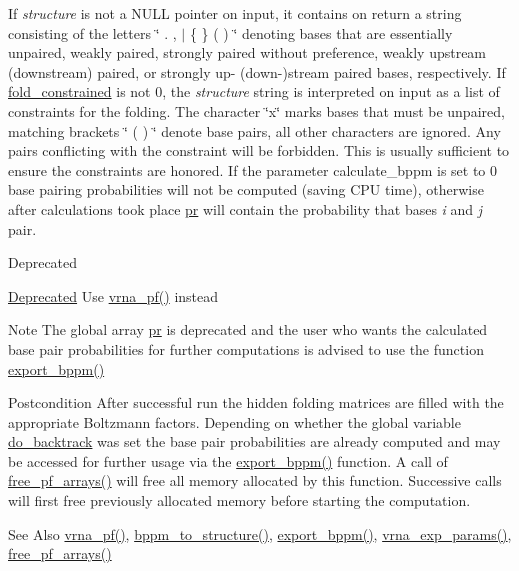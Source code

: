 If {\itshape structure} is not a N\-U\-L\-L pointer on input, it contains on return a string consisting of the letters \char`\"{} . , $\vert$ \{ \} ( ) \char`\"{} denoting bases that are essentially unpaired, weakly paired, strongly paired without preference, weakly upstream (downstream) paired, or strongly up-\/ (down-\/)stream paired bases, respectively. If \hyperlink{fold__vars_8h_a0afc287c2464866d94858c39175154af}{fold\-\_\-constrained} is not 0, the {\itshape structure} string is interpreted on input as a list of constraints for the folding. The character \char`\"{}x\char`\"{} marks bases that must be unpaired, matching brackets \char`\"{} ( ) \char`\"{} denote base pairs, all other characters are ignored. Any pairs conflicting with the constraint will be forbidden. This is usually sufficient to ensure the constraints are honored. If the parameter calculate\-\_\-bppm is set to 0 base pairing probabilities will not be computed (saving C\-P\-U time), otherwise after calculations took place \hyperlink{fold__vars_8h_ac98ec419070aee6831b44e5c700f090f}{pr} will contain the probability that bases {\itshape i} and {\itshape j} pair.

\begin{DoxyRefDesc}{Deprecated}
\item[\hyperlink{deprecated__deprecated000094}{Deprecated}]Use \hyperlink{group__pf__fold_ga29e256d688ad221b78d37f427e0e99bc}{vrna\-\_\-pf()} instead\end{DoxyRefDesc}


\begin{DoxyNote}{Note}
The global array \hyperlink{fold__vars_8h_ac98ec419070aee6831b44e5c700f090f}{pr} is deprecated and the user who wants the calculated base pair probabilities for further computations is advised to use the function \hyperlink{group__pf__fold_gac5ac7ee281aae1c5cc5898a841178073}{export\-\_\-bppm()} 
\end{DoxyNote}
\begin{DoxyPostcond}{Postcondition}
After successful run the hidden folding matrices are filled with the appropriate Boltzmann factors. Depending on whether the global variable \hyperlink{group__model__details_gad512b5dd4dbec60faccfe137bb474489}{do\-\_\-backtrack} was set the base pair probabilities are already computed and may be accessed for further usage via the \hyperlink{group__pf__fold_gac5ac7ee281aae1c5cc5898a841178073}{export\-\_\-bppm()} function. A call of \hyperlink{group__pf__fold_gae73db3f49a94f0f72e067ecd12681dbd}{free\-\_\-pf\-\_\-arrays()} will free all memory allocated by this function. Successive calls will first free previously allocated memory before starting the computation. 
\end{DoxyPostcond}
\begin{DoxySeeAlso}{See Also}
\hyperlink{group__pf__fold_ga29e256d688ad221b78d37f427e0e99bc}{vrna\-\_\-pf()}, \hyperlink{group__struct__utils_ga129d81c4a1ead793c5b2311333e03dfa}{bppm\-\_\-to\-\_\-structure()}, \hyperlink{group__pf__fold_gac5ac7ee281aae1c5cc5898a841178073}{export\-\_\-bppm()}, \hyperlink{group__energy__parameters_gab1f3016f96aa96bff020cdd904605afa}{vrna\-\_\-exp\-\_\-params()}, \hyperlink{group__pf__fold_gae73db3f49a94f0f72e067ecd12681dbd}{free\-\_\-pf\-\_\-arrays()} 
\end{DoxySeeAlso}

